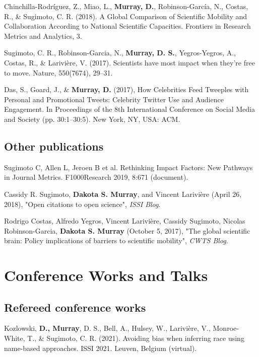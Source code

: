 \documentclass[10pt, a4paper]{article}
\newcommand{\years}[1]{\marginnote{\scriptsize #1}}
\begin{document}
\years{2018} \hangindent=0.7cm Chinchilla-Rodríguez, Z., Miao, L., \textbf{Murray, D.}, Robinson-García, N., Costas, R., \& Sugimoto, C. R. (2018). A Global Comparison of Scientific Mobility and Collaboration According to National Scientific Capacities. Frontiers in Research Metrics and Analytics, 3. 

\years{2017} \hangindent=0.7cm Sugimoto, C. R., Robinson-Garcia, N., \textbf{Murray, D. S.}, Yegros-Yegros, A., Costas, R., \& Larivière, V. (2017). Scientists have most impact when they’re free to move. Nature, 550(7674), 29–31. 

\years{2017} \hangindent=0.7cm Das, S., Goard, J., \& \textbf{Murray, D.} (2017), How Celebrities Feed Tweeples with Personal and Promotional Tweets: Celebrity Twitter Use and Audience Engagement. In Proceedings of the 8th International Conference on Social Media and Society (pp. 30:1–30:5). New York, NY, USA: ACM. 

\subsection*{Other publications}
\noindent

\years{2019} \hangindent=0.7cm Sugimoto C, Allen L, Jeroen B et al. Rethinking Impact Factors: New Pathways in Journal Metrics. F1000Research 2019, 8:671 (document). 

\years{2018} \hangindent=0.7cm Cassidy R. Sugimoto, \textbf{Dakota S. Murray}, and Vincent Larivière (April 26, 2018), "Open citations to open science", \emph{ISSI Blog}. 

\years{2017} \hangindent=0.7cm Rodrigo Costas, Alfredo Yegros, Vincent Larivière, Cassidy Sugimoto, Nicolas Robinson-Garcia, \textbf{Dakota S. Murray} (October 5, 2017), "The global scientific brain: Policy implications of barriers to scientific mobility", \emph{CWTS Blog}. 

\section*{Conference Works and Talks}

\subsection*{Refereed conference works}

\years{2021}  \hangindent=0.7cm Kozlowski, \textbf{D., Murray}, D. S., Bell, A., Hulsey, W., Larivière, V., Monroe-White, T., \& Sugimoto, C. R. (2021). Avoiding bias when inferring race using name-based approaches. ISSI 2021. Leuven, Belgium (virtual).
\end{document}
